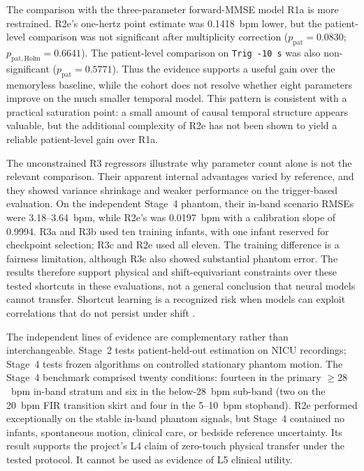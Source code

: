 The comparison with the three-parameter forward-MMSE model R1a is more restrained. R2e's
one-hertz point estimate was 0.1418~bpm lower, but the patient-level comparison was not
significant after multiplicity correction ($p_{\mathrm{pat}}=0.0830$;
$p_{\mathrm{pat,Holm}}=0.6641$). The patient-level comparison on \texttt{Trig -10 s} was also
non-significant ($p_{\mathrm{pat}}=0.5771$). Thus the evidence supports a useful gain over the
memoryless baseline, while the cohort does not resolve whether eight parameters improve on the
much smaller temporal model. This pattern is consistent with a practical saturation point: a
small amount of causal temporal structure appears valuable, but the additional complexity of
R2e has not been shown to yield a reliable patient-level gain over R1a.

The unconstrained R3 regressors illustrate why parameter count alone is not the relevant
comparison. Their apparent internal advantages varied by reference, and they showed variance
shrinkage and weaker performance on the trigger-based evaluation. On the independent Stage~4
phantom, their in-band scenario RMSEs were 3.18--3.64~bpm, while R2e's was 0.0197~bpm with a
calibration slope of 0.9994. R3a and R3b used ten training infants, with one infant reserved for
checkpoint selection; R3c and R2e used all eleven. The training difference is a fairness
limitation, although R3c also showed substantial phantom error. The results therefore support
physical and shift-equivariant constraints over these tested shortcuts in these evaluations, not
a general conclusion that neural models cannot transfer. Shortcut learning is a recognized risk
when models can exploit correlations that do not persist under shift \citep{geirhos2020shortcut}.

The independent lines of evidence are complementary rather than interchangeable. Stage~2 tests
patient-held-out estimation on NICU recordings; Stage~4 tests frozen algorithms on controlled
stationary phantom motion. The Stage~4 benchmark comprised twenty conditions: fourteen in the
primary $\ge 28$~bpm in-band stratum and six in the below-28~bpm sub-band (two on the 20~bpm
FIR transition skirt and four in the 5--10~bpm stopband). R2e performed exceptionally on the
stable in-band
phantom signals, but Stage~4 contained no infants, spontaneous motion, clinical care, or bedside
reference uncertainty. Its result supports the project's L4 claim of zero-touch physical
transfer under the tested protocol. It cannot be used as evidence of L5 clinical utility.

